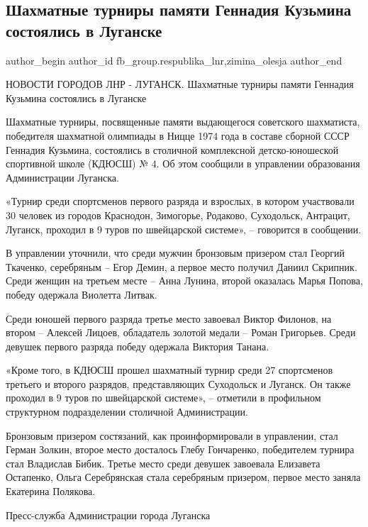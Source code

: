  
 
 
 
 
 
\subsection{Шахматные турниры памяти Геннадия Кузьмина состоялись в Луганске}
\label{sec:24_01_2022.fb.fb_group.respublika_lnr.2.chess_turnir_gennadij_kuzmin}
 
\ifcmt
 author_begin
   author_id fb_group.respublika_lnr,zimina_olesja
 author_end
\fi

НОВОСТИ ГОРОДОВ ЛНР - ЛУГАНСК. Шахматные турниры памяти Геннадия Кузьмина
состоялись в Луганске

Шахматные турниры, посвященные памяти выдающегося советского шахматиста,
победителя шахматной олимпиады в Ницце 1974 года в составе сборной СССР
Геннадия Кузьмина, состоялись в столичной комплексной детско-юношеской
спортивной школе (КДЮСШ) № 4. Об этом сообщили в управлении образования
Администрации Луганска.


«Турнир среди спортсменов первого разряда и взрослых, в котором участвовали 30
человек из городов Краснодон, Зимогорье, Родаково, Суходольск, Антрацит,
Луганск, проходил в 9 туров по швейцарской системе», – говорится в сообщении.

В управлении уточнили, что среди мужчин бронзовым призером стал Георгий
Ткаченко, серебряным – Егор Демин, а первое место получил Даниил Скрипник.
Среди женщин на третьем месте – Анна Лунина, второй оказалась Марья Попова,
победу одержала Виолетта Литвак.

Среди юношей первого разряда третье место завоевал Виктор Филонов, на втором –
Алексей Лицоев, обладатель золотой медали – Роман Григорьев. Среди девушек
первого разряда победу одержала Виктория Танана.

«Кроме того, в КДЮСШ прошел шахматный турнир среди 27 спортсменов третьего и
второго разрядов, представляющих Суходольск и Луганск. Он также проходил в 9
туров по швейцарской системе», – отметили в профильном структурном
подразделении столичной Администрации.

Бронзовым призером состязаний, как проинформировали в управлении, стал Герман
Золкин, второе место досталось Глебу Гончаренко, победителем турнира стал
Владислав Бибик. Третье место среди девушек завоевала Елизавета Остапенко,
Ольга Серебрянская стала серебряным призером, первое место заняла Екатерина
Полякова.

Пресс-служба Администрации города Луганска
